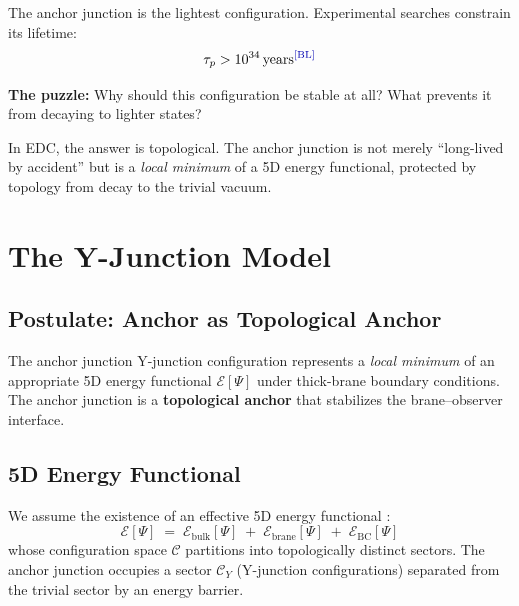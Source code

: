 The anchor junction is the lightest \Junction{} configuration. Experimental searches constrain
its lifetime:
\begin{equation}
    \tau_p > 10^{34} \, \text{years} \tagBL
\end{equation}

\noindent
\textbf{The puzzle:} Why should this configuration be stable at all? What prevents it
from decaying to lighter states?

In EDC, the answer is topological. The anchor junction is not merely ``long-lived by accident''
but is a \emph{local minimum} of a 5D energy functional, protected by topology from
decay to the trivial vacuum.

\section{The Y-Junction Model}
\label{sec:anchor:yjunction}

\subsection{Postulate: Anchor as Topological Anchor}

\begin{derivationbox}[title=Postulate: Anchor Stability Principle]
    The anchor junction Y-junction configuration represents a \emph{local minimum} of an
    appropriate 5D energy functional $\mathcal{E}[\Psi]$ under thick-brane boundary
    conditions. The anchor junction is a \textbf{topological anchor} that stabilizes the
    brane--observer interface. \tagP
\end{derivationbox}

\subsection{5D Energy Functional}

We assume the existence of an effective 5D energy functional \tagP:
\begin{equation}
    \label{eq:5d_energy_functional}
    \mathcal{E}[\Psi] \;=\; \mathcal{E}_{\mathrm{bulk}}[\Psi]
        \;+\; \mathcal{E}_{\mathrm{brane}}[\Psi]
        \;+\; \mathcal{E}_{\mathrm{BC}}[\Psi]
\end{equation}
whose configuration space $\mathcal{C}$ partitions into topologically distinct sectors.
The anchor junction occupies a sector $\mathcal{C}_Y$ (Y-junction configurations) separated
from the trivial sector by an energy barrier.

